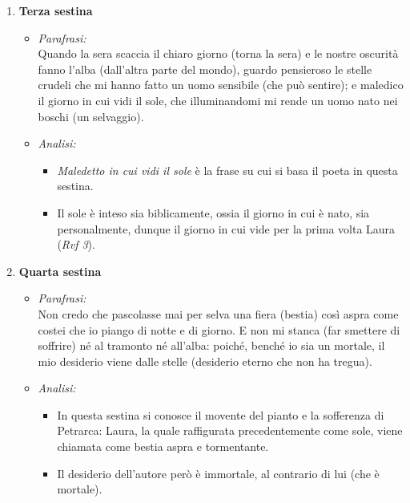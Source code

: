 \documentclass{article}
\begin{document}
\begin{enumerate}
\begin{enumerate}[label=]
\begin{itemize}[label=]
\begin{itemize}
                        \end{itemize}
                \end{itemize}
            \item \textbf{Terza sestina}
                \begin{itemize}[label=]
                    \item \textit{Parafrasi:}\\
                        Quando la sera scaccia il chiaro giorno (torna la sera) e le nostre oscurità fanno l'alba (dall'altra parte del mondo), guardo pensieroso le stelle crudeli che mi hanno fatto un uomo sensibile (che può sentire); e maledico il giorno in cui vidi il sole, che illuminandomi mi rende un uomo nato nei boschi (un selvaggio).
                    \item \textit{Analisi:}
                        \begin{itemize}
                            \item \textit{Maledetto in cui vidi il sole} è la frase su cui si basa il poeta in questa sestina.
                            \item Il sole è inteso sia biblicamente, ossia il giorno in cui è nato, sia personalmente, dunque il giorno in cui vide per la prima volta Laura (\textit{Rvf 3}).
                        \end{itemize}
                \end{itemize}
            \item \textbf{Quarta sestina}
                \begin{itemize}[label=]
                    \item \textit{Parafrasi:}\\
                        Non credo che pascolasse mai per selva una fiera (bestia) così aspra come costei che io piango di notte e di giorno. E non mi stanca (far smettere di soffrire) né al tramonto né all'alba: poiché, benché io sia un mortale, il mio desiderio viene dalle stelle (desiderio eterno che non ha tregua).
                    \item \textit{Analisi:}
                        \begin{itemize}
                            \item In questa sestina si conosce il movente del pianto e la sofferenza di Petrarca: Laura, la quale raffigurata precedentemente come sole, viene chiamata come bestia aspra e tormentante.
                            \item Il desiderio dell'autore però è immortale, al contrario di lui (che è mortale).

\end{itemize}
\end{itemize}
\end{enumerate}
\end{enumerate}
\end{document}
